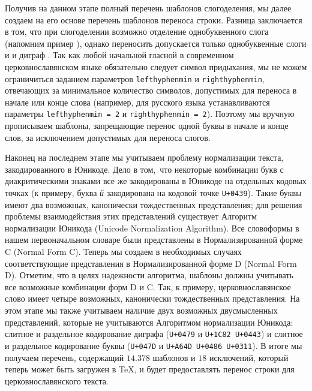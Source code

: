 \documentclass[12pt,a4paper,oneside]{extarticle}
\begin{document}
Получив на данном этапе полный перечень шаблонов слогоделения, мы далее создаем на его основе перечень шаблонов переноса строки. Разница заключается в том, что при слогоделении возможно отделение однобуквенного слога (напомним пример ), однако переносить допускается только однобуквенные слоги  и  и диграф . Так как любой начальной гласной в современном церковнославянском языке обязательно следует символ придыхания, мы не можем ограничиться заданием параметров \verb+lefthyphenmin+ и \verb+righthyphenmin+, отвечающих за минимальное количество символов, допустимых для переноса в начале или конце слова (например, для русского языка устанавливаются параметры \verb+lefthyphenmin = 2+ и \verb+righthyphenmin = 2+). Поэтому мы вручную прописываем шаблоны, запрещающие перенос одной буквы в начале и конце слов, за исключением допустимых для переноса слогов.

Наконец на последнем этапе мы учитываем проблему нормализации текста, закодированного в Юникоде. Дело в том, что некоторые комбинации букв с диакритическими знаками все же закодированы в Юникоде на отдельных кодовых точках (к примеру, буква \emph{й} закодирована на кодовой точке \verb!U+0439!). Такие буквы имеют два возможных, канонически тождественных представления; для решения проблемы взаимодействия этих представлений существует Алгоритм нормализации Юникода (\textenglish{Unicode Normalization Algorithm})\autocite[Подробности см. ][]{tr15}. Все словоформы в нашем первоначальном словаре были представлены в Нормализированной форме C (\textenglish{Normal Form C}). Теперь мы создаем в необходимых случаях соответствующие представления в Нормализированной форме D (\textenglish{Normal Form D}). Отметим, что в целях надежности алгоритма, шаблоны должны учитывать все возможные комбинации форм D и C. Так, к примеру, церковнославянское слово  имеет четыре возможных, канонически тождественных представления. На этом этапе мы также учитываем наличие двух возможных двусмысленных представлений, которые не учитываются Алгоритмом нормализации Юникода: слитное и раздельное кодирование диграфа  (\verb!U+0479! и \verb!U+1C82 U+0443!) и слитное и раздельное кодирование буквы  (\verb!U+047D! и \verb!U+A64D U+0486 U+0311!)\autocite[Специфику нормализации церковнославянского текста см. в работе ][]{utn41}. В итоге мы получаем перечень, содержащий $14.378$ шаблонов и $18$ исключений, который теперь может быть загружен в \TeX{}, и будет предоставлять перенос строки для церковнославянского текста.
\end{document}
